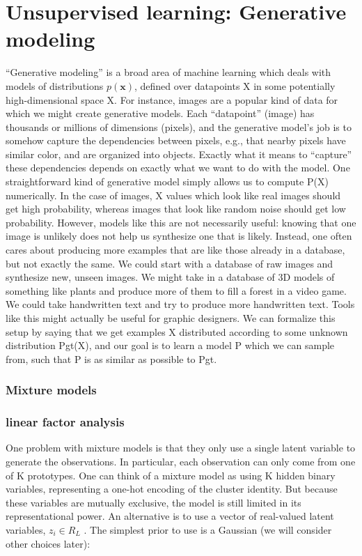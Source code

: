 \section{Unsupervised learning: Generative modeling}
%
“Generative modeling” is a broad area of machine learning which deals with models of distributions $p(\bm{x})$, defined over datapoints X in some potentially high-dimensional space X. For instance, images are a popular kind of data for which we might create generative models. Each “datapoint” (image) has thousands or millions of dimensions (pixels), and the generative model’s job is to somehow capture the dependencies between pixels, e.g., that nearby
pixels have similar color, and are organized into objects. Exactly what it means to “capture” these dependencies depends on exactly what we want to do with the model. One straightforward kind of generative model simply allows us to compute P(X) numerically. In the case of images, X values  which look like real images should get high probability, whereas images that look like random noise should get low probability. However, models like this are not necessarily useful: knowing that one image is unlikely does not help us synthesize one that is likely. Instead, one often cares about producing more examples that are like those already in a database, but not exactly the same. We could start with a database of raw images and synthesize new, unseen images. We might take in a database of 3D models of something like plants and produce more of them to fill a forest in a video game. We could take handwritten text and try to produce more handwritten text. Tools like this might actually be useful for graphic designers. We can formalize this setup by saying that we get examples X distributed according to some unknown distribution Pgt(X), and our goal is to learn a model P which we can sample from, such that P is as similar as possible to Pgt.




\subsubsection{Mixture models}



\subsubsection{linear factor analysis}

One problem with mixture models is that they only use a single latent variable to generate the
observations. In particular, each observation can only come from one of K prototypes. One can
think of a mixture model as using K hidden binary variables, representing a one-hot encoding
of the cluster identity. But because these variables are mutually exclusive, the model is still
limited in its representational power.
An alternative is to use a vector of real-valued latent variables, $z_i \in R_L$ . The simplest prior
to use is a Gaussian (we will consider other choices later):


